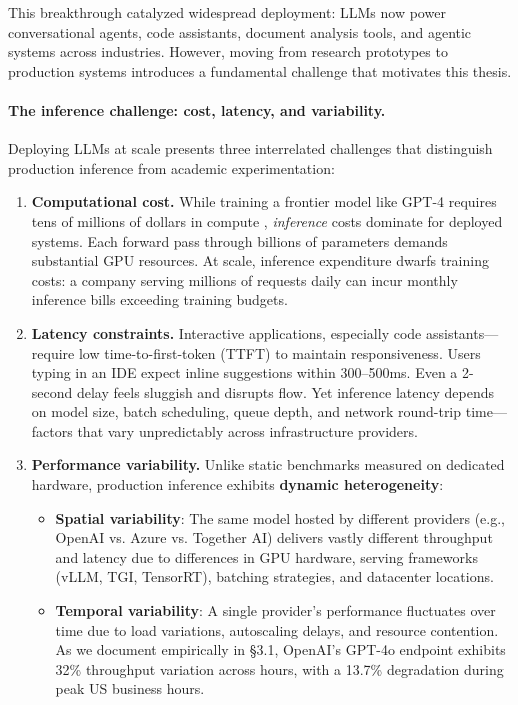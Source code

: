 \documentclass[english]{article}
\begin{document}
This breakthrough catalyzed widespread deployment: LLMs now power conversational agents, code assistants, document analysis tools, and agentic systems across industries. However, moving from research prototypes to production systems introduces a fundamental challenge that motivates this thesis.

\paragraph{The inference challenge: cost, latency, and variability.}

Deploying LLMs at scale presents three interrelated challenges that distinguish production inference from academic experimentation:

\begin{enumerate}
\item \textbf{Computational cost.} While training a frontier model like GPT-4 requires tens of millions of dollars in compute \parencite{hoffmann2022training}, \emph{inference} costs dominate for deployed systems. Each forward pass through billions of parameters demands substantial GPU resources. At scale, inference expenditure dwarfs training costs: a company serving millions of requests daily can incur monthly inference bills exceeding training budgets.

\item \textbf{Latency constraints.} Interactive applications, especially code assistants—require low time-to-first-token (TTFT) to maintain responsiveness. Users typing in an IDE expect inline suggestions within 300--500ms. Even a 2-second delay feels sluggish and disrupts flow. Yet inference latency depends on model size, batch scheduling, queue depth, and network round-trip time—factors that vary unpredictably across infrastructure providers.

\item \textbf{Performance variability.} Unlike static benchmarks measured on dedicated hardware, production inference exhibits \textbf{dynamic heterogeneity}:
\begin{itemize}
    \item \textbf{Spatial variability}: The same model hosted by different providers (e.g., OpenAI vs. Azure vs. Together AI) delivers vastly different throughput and latency due to differences in GPU hardware, serving frameworks (vLLM, TGI, TensorRT), batching strategies, and datacenter locations.
    \item \textbf{Temporal variability}: A single provider's performance fluctuates over time due to load variations, autoscaling delays, and resource contention. As we document empirically in §3.1, OpenAI's GPT-4o endpoint exhibits 32\% throughput variation across hours, with a 13.7\% degradation during peak US business hours.
\end{itemize}
\end{enumerate}
\end{document}

